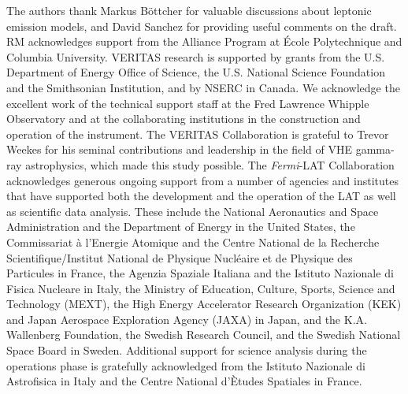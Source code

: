 \documentclass[twocolumn]{aastex6}
\begin{document}
\acknowledgements
The authors thank Markus B{\"o}ttcher for valuable discussions about leptonic emission models, and David Sanchez for providing useful comments on the draft. RM  acknowledges support from the Alliance Program at \'Ecole Polytechnique and Columbia University.
VERITAS research is supported by grants from the U.S. Department of Energy Office of Science, the U.S. National Science Foundation and the Smithsonian Institution, and by NSERC in Canada. We acknowledge the excellent work of the technical support staff at the Fred Lawrence Whipple Observatory and at the collaborating institutions in the construction and operation of the instrument. The VERITAS Collaboration is grateful to Trevor Weekes for his seminal contributions and leadership in the field of VHE gamma-ray astrophysics, which made this study possible.
The {\it Fermi}-LAT Collaboration acknowledges generous ongoing support from a number of agencies and institutes that have supported both the development and the operation of the LAT as well as scientific data analysis. These include the National Aeronautics and Space Administration and the Department of Energy in the United States, the Commissariat \`{a} l'Energie Atomique and the Centre National de la Recherche Scientifique/Institut National de Physique Nucl\'{e}aire et de Physique des Particules in France, the Agenzia Spaziale Italiana and the Istituto Nazionale di Fisica Nucleare in Italy, the Ministry of Education, Culture, Sports, Science and Technology (MEXT), the High Energy Accelerator Research Organization (KEK) and Japan Aerospace Exploration Agency (JAXA) in Japan, and the K.A. Wallenberg Foundation, the Swedish Research Council, and the Swedish National Space Board in Sweden. Additional support for science analysis during the operations phase is gratefully acknowledged from the Istituto Nazionale di Astrofisica in Italy and the Centre National d'\`{E}tudes Spatiales in France.
\end{document}
